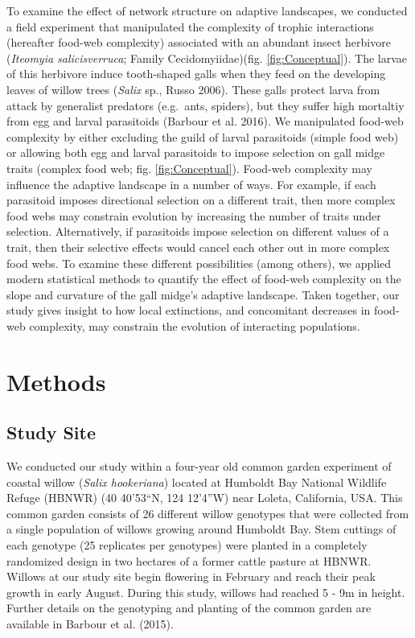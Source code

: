 \documentclass[11pt,]{article}
\begin{document}
To examine the effect of network structure on adaptive landscapes, we
conducted a field experiment that manipulated the complexity of trophic
interactions (hereafter food-web complexity) associated with an abundant
insect herbivore (\emph{Iteomyia salicisverruca}; Family
Cecidomyiidae)(fig. \ref{fig:Conceptual}). The larvae of this herbivore
induce tooth-shaped galls when they feed on the developing leaves of
willow trees (\emph{Salix} sp., Russo 2006). These galls protect larva
from attack by generalist predators (e.g.~ants, spiders), but they
suffer high mortaltiy from egg and larval parasitoids (Barbour et al.
2016). We manipulated food-web complexity by either excluding the guild
of larval parasitoids (simple food web) or allowing both egg and larval
parasitoids to impose selection on gall midge traits (complex food web;
fig. \ref{fig:Conceptual}). Food-web complexity may influence the
adaptive landscape in a number of ways. For example, if each parasitoid
imposes directional selection on a different trait, then more complex
food webs may constrain evolution by increasing the number of traits
under selection. Alternatively, if parasitoids impose selection on
different values of a trait, then their selective effects would cancel
each other out in more complex food webs. To examine these different
possibilities (among others), we applied modern statistical methods to
quantify the effect of food-web complexity on the slope and curvature of
the gall midge's adaptive landscape. Taken together, our study gives
insight to how local extinctions, and concomitant decreases in food-web
complexity, may constrain the evolution of interacting populations.

\section{Methods}\label{methods}

\subsection{Study Site}\label{study-site}

We conducted our study within a four-year old common garden experiment
of coastal willow (\emph{Salix hookeriana}) located at Humboldt Bay
National Wildlife Refuge (HBNWR) (40 40'53``N, 124 12'4''W) near Loleta,
California, USA. This common garden consists of 26 different willow
genotypes that were collected from a single population of willows
growing around Humboldt Bay. Stem cuttings of each genotype (25
replicates per genotypes) were planted in a completely randomized design
in two hectares of a former cattle pasture at HBNWR. Willows at our
study site begin flowering in February and reach their peak growth in
early August. During this study, willows had reached 5 - 9m in height.
Further details on the genotyping and planting of the common garden are
available in Barbour et al. (2015).
\end{document}
